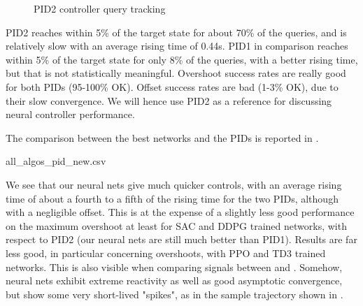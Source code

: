 \documentclass[anonymous=true,format=sigconf, screen=true, review=false]{acmart}
\begin{document}
\begin{figure}
\caption{PID2 controller query tracking}
\label{fig:pid_traces}
\end{figure}

PID2 reaches within 5\% of the target state for about 70\% of the queries, and is relatively slow with an average rising time of 0.44s. PID1 in comparison reaches within 5\% of the target state for only 8\% of the queries, with a better rising time, but that is not statistically meaningful. Overshoot success rates are really good for both PIDs (95-100\% OK). Offset success rates are bad (1-3\% OK), due to their slow convergence.
We will hence use PID2 as a reference for discussing neural controller performance.

The comparison between the best networks and the PIDs is reported in . 
\begin{csvtable*}{all_algos_pid_new.csv}
\caption{PIDs and overall best networks performance (all in \% except rising t. in seconds)}
\label{fig:pidnnnominal}
\end{csvtable*}
We see that our neural nets give much quicker controls, with an average rising time of about a fourth to a fifth of the rising time for the two PIDs, although with a negligible offset. 
This is at the expense of a slightly less good performance on the maximum overshoot at least for SAC and DDPG trained networks, with respect to PID2 (our neural nets are still much better than PID1). Results are far less good, in particular concerning overshoots, with PPO and TD3 trained networks. %
This is also visible when comparing signals between   and . Somehow, neural nets exhibit extreme reactivity as well as good asymptotic convergence, but show some very short-lived "spikes", as in the sample trajectory shown in . 
\end{document}
